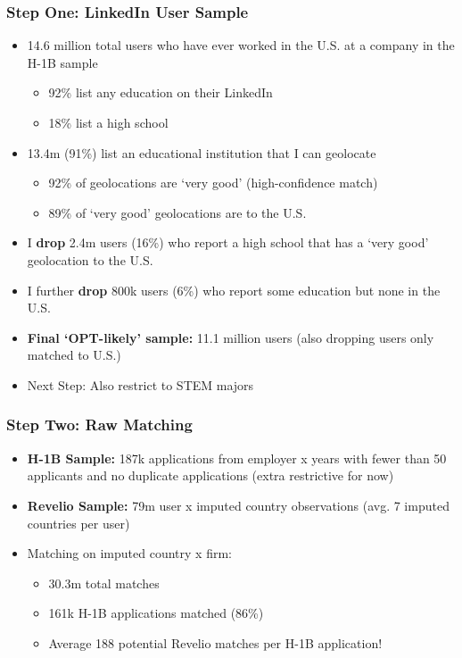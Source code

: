 \documentclass[xcolor=dvipsnames, compress, 12pt, aspectratio=169, handout]{beamer}
\begin{document}
\begin{frame}
    \frametitle{Step One: LinkedIn User Sample}
    \begin{itemize}
        \item 14.6 million total users who have ever worked in the U.S. at a company in the H-1B sample
        \begin{itemize}
            \item 92\% list any education on their LinkedIn
            \item 18\% list a high school
        \end{itemize}
        \item 13.4m (91\%) list an educational institution that I can geolocate
        \begin{itemize}
            \item 92\% of geolocations are `very good' (high-confidence match)
            \item 89\% of `very good' geolocations are to the U.S.
        \end{itemize}
        \item I \textbf{drop} 2.4m users (16\%) who report a high school that has a `very good' geolocation to the U.S.
        \item I further \textbf{drop} 800k users (6\%) who report some education but none in the U.S.
        \item \textbf{Final `OPT-likely' sample:} 11.1 million users (also dropping users only matched to U.S.)
        \item Next Step: Also restrict to STEM majors
    \end{itemize}
\end{frame}

\begin{frame}
    \frametitle{Step Two: Raw Matching}
    \begin{itemize}
        \item \textbf{H-1B Sample:} 187k applications from employer x years with fewer than 50 applicants and no duplicate applications (extra restrictive for now) 
        \item \textbf{Revelio Sample:} 79m user x imputed country observations (avg. 7 imputed countries per user)
        \item Matching on imputed country x firm: 
        \begin{itemize}
            \item 30.3m total matches 
            \item 161k H-1B applications matched (86\%) 
            \item Average 188 potential Revelio matches per H-1B application!
        \end{itemize}
    \end{itemize}
\end{frame}
\end{document}
